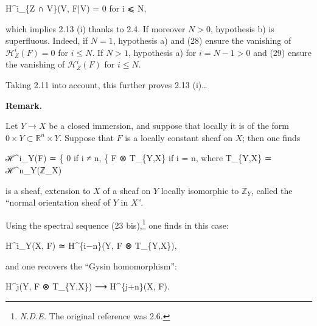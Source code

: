 \documentclass[
]{article}
\newenvironment{Shaded}{}{}
\newcommand{\NormalTok}[1]{#1}
\begin{document}
\begin{Shaded}
\begin{Highlighting}[]
\NormalTok{H\^{}i\_\{Z ∩ V\}(V, F|V) = 0 for i ⩽ N,}
\end{Highlighting}
\end{Shaded}

which implies 2.13 (i) thanks to 2.4. If moreover \(N > 0\), hypothesis
b) is superfluous. Indeed, if \(N = 1\), hypothesis a) and (28) ensure
the vanishing of \(\mathcal{H}^{i}_{Z}(F) = 0\) for \(i \leqslant N\).
If \(N > 1\), hypothesis a) for \(i = N - 1 > 0\) and (29) ensure the
vanishing of \(\mathcal{H}^{i}_{Z}(F)\) for \(i \leqslant N\).

Taking 2.11 into account, this further proves 2.13 (i)\ldots{}

\textbf{Remark.}

Let \(Y \to X\) be a closed immersion, and suppose that locally it is of
the form \({0} \times Y \subset \mathbb{R}^{n} \times Y\). Suppose that
\(F\) is a locally constant sheaf on \(X\); then one finds

\begin{Shaded}
\begin{Highlighting}[]
\NormalTok{ℋ\^{}i\_Y(F) ≃ \{ 0            if i ≠ n,}
\NormalTok{           \{ F ⊗ T\_\{Y,X\}   if i = n,    where  T\_\{Y,X\} ≃ ℋ\^{}n\_Y(ℤ\_X)}
\end{Highlighting}
\end{Shaded}

is a sheaf, extension to \(X\) of a sheaf on \(Y\) locally isomorphic to
\(\mathbb{Z}_{Y}\), called the ``normal orientation sheaf of \(Y\) in
\(X\)''.

Using the spectral sequence (23 bis),\footnote{\emph{N.D.E.} The
  original reference was 2.6.} one finds in this case:

\begin{Shaded}
\begin{Highlighting}[]
\NormalTok{H\^{}i\_Y(X, F) ≃ H\^{}\{i−n\}(Y, F ⊗ T\_\{Y,X\}),}
\end{Highlighting}
\end{Shaded}

and one recovers the ``Gysin homomorphism'':

\begin{Shaded}
\begin{Highlighting}[]
\NormalTok{H\^{}j(Y, F ⊗ T\_\{Y,X\}) ⟶ H\^{}\{j+n\}(X, F).}
\end{Highlighting}
\end{Shaded}
\end{document}
